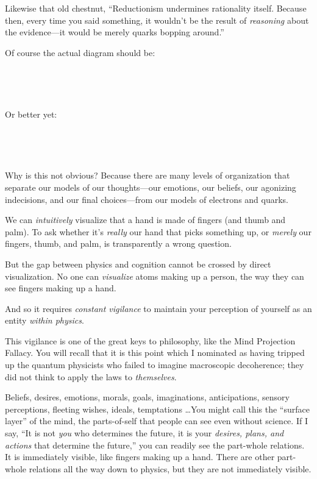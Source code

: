 {
 Likewise that old chestnut, ``Reductionism
undermines rationality itself. Because then, every time you said
something, it wouldn't be the result of
\textit{reasoning} about the evidence---it would be merely quarks
bopping around.''}

{
 Of course the actual diagram should be:}

{
 ~}

{\centering
{}
 
\par}


\bigskip

{
 ~}

{
 Or better yet:}

{
 ~}

{\centering
{}
 
\par}


\bigskip

{
 ~}

{
 Why is this not obvious? Because there are many levels of
organization that separate our models of our thoughts---our emotions,
our beliefs, our agonizing indecisions, and our final choices---from
our models of electrons and quarks.}

{
 We can \textit{intuitively} visualize that a hand is made of
fingers (and thumb and palm). To ask whether it's
\textit{really} our hand that picks something up, or \textit{merely}
our fingers, thumb, and palm, is transparently a wrong question.}

{
 But the gap between physics and cognition cannot be crossed by
direct visualization. No one can \textit{visualize} atoms making up a
person, the way they can see fingers making up a hand.}

{
 And so it requires \textit{constant vigilance} to maintain your
perception of yourself as an entity \textit{within physics}.}

{
 This vigilance is one of the great keys to philosophy, like the
Mind Projection Fallacy. You will recall that it is this point which I
nominated as having tripped up the quantum physicists who failed to
imagine macroscopic decoherence; they did not think to apply the laws
to \textit{themselves}.}

{
 Beliefs, desires, emotions, morals, goals, imaginations,
anticipations, sensory perceptions, fleeting wishes, ideals,
temptations \ldots You might call this the ``surface
layer'' of the mind, the parts-of-self that people
can see even without science. If I say, ``It is not
\textit{you} who determines the future, it is your \textit{desires,
plans, and actions} that determine the future,'' you
can readily see the part-whole relations. It is immediately visible,
like fingers making up a hand. There are other part-whole relations all
the way down to physics, but they are not immediately visible.}

